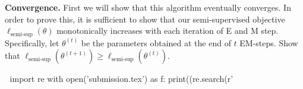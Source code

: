 \item{}
\textbf{Convergence.}
First we will show that this algorithm eventually converges. In order to prove this, it is sufficient to show that our semi-supervised objective $\ell_\text{semi-sup}(\theta)$ monotonically increases with each iteration of E and M step. Specifically, let $\theta^{(t)}$ be the parameters obtained at the end of $t$ EM-steps. Show that $\ell_\text{semi-sup}(\theta^{(t+1)}) \ge \ell_\text{semi-sup}(\theta^{(t)})$.

🐍
import re
with open('submission.tex') as f: print((re.search(r'%
🐍
